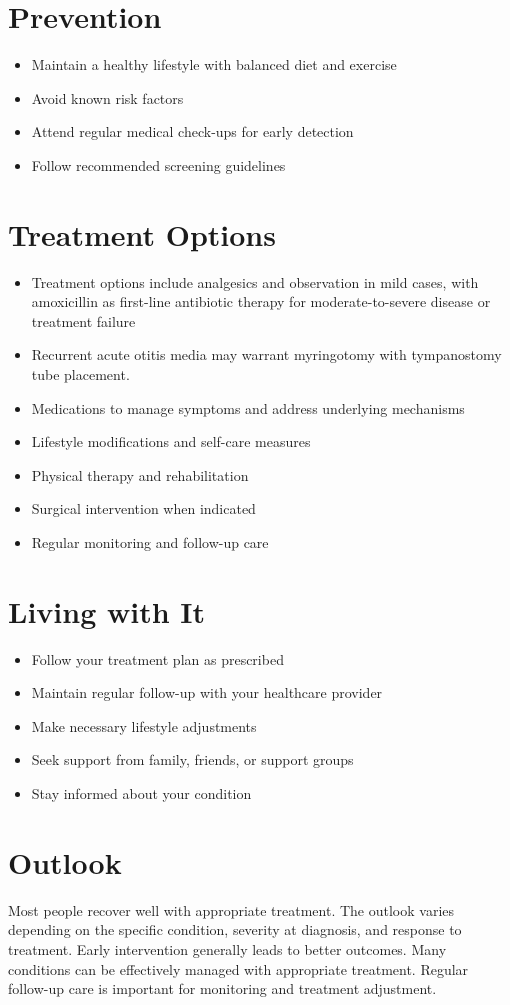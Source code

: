 \section{Prevention}
\begin{itemize}[noitemsep]
  \item Maintain a healthy lifestyle with balanced diet and exercise
  \item Avoid known risk factors
  \item Attend regular medical check-ups for early detection
  \item Follow recommended screening guidelines
\end{itemize}
\section{Treatment Options}
\begin{itemize}[noitemsep]
  \item Treatment options include analgesics and observation in mild cases, with amoxicillin as first-line antibiotic therapy for moderate-to-severe disease or treatment failure
  \item Recurrent acute otitis media may warrant myringotomy with tympanostomy tube placement.
  \item Medications to manage symptoms and address underlying mechanisms
  \item Lifestyle modifications and self-care measures
  \item Physical therapy and rehabilitation
  \item Surgical intervention when indicated
  \item Regular monitoring and follow-up care
\end{itemize}
\section{Living with It}
\begin{itemize}[noitemsep]
  \item Follow your treatment plan as prescribed
  \item Maintain regular follow-up with your healthcare provider
  \item Make necessary lifestyle adjustments
  \item Seek support from family, friends, or support groups
  \item Stay informed about your condition
\end{itemize}
\section{Outlook}
Most people recover well with appropriate treatment. The outlook varies depending on the specific condition, severity at diagnosis, and response to treatment. Early intervention generally leads to better outcomes. Many conditions can be effectively managed with appropriate treatment. Regular follow-up care is important for monitoring and treatment adjustment.
